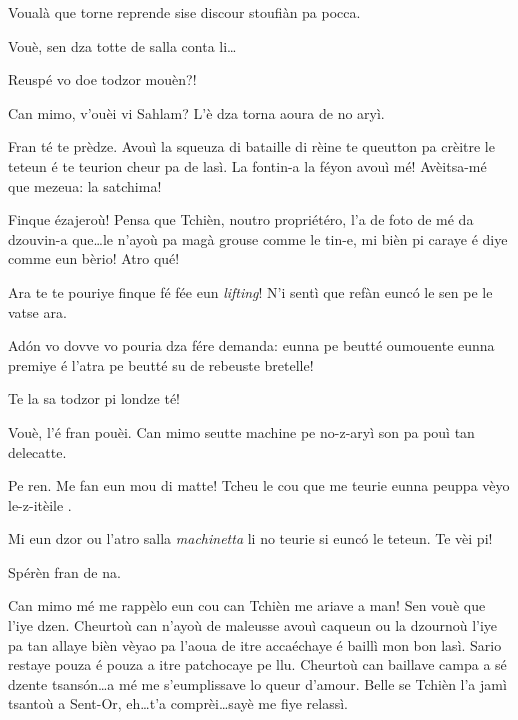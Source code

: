 \begin{drama}
\Cobraspeaks Voualà que torne reprende sise discour stoufiàn pa pocca.

\Piccinaspeaks Vouè, sen dza totte de salla conta li\ldots

\Tzardounspeaks Reuspé vo doe todzor mouèn?!

\Cobraspeaks Can mimo, v'ouèi vi Sahlam? L’è dza torna aoura de no aryì.

\Piccinaspeaks Fran té te prèdze. Avouì la squeuza di bataille di rèine te queutton pa crèitre le teteun é te teurion cheur pa de lasì\latte. La fontin-a la féyon avouì mé!  Avèitsa-mé que mezeua: la satchima!

\Tzardounspeaks Finque ézajeroù! Pensa que Tchièn, noutro propriétéro, l’a de foto de mé da dzouvin-a que\ldots le n’ayoù pa magà grouse comme le tin-e, mi bièn pi caraye é diye comme eun bèrio! Atro qué!


\Piccinaspeaks  {} Ara te te pouriye finque fé fée eun \textit{lifting}! N’i sentì que refàn eunc\'o le sen pe le vatse ara.
 

\Tzardounspeaks Ad\'on vo dovve vo pouria dza fére demanda: eunna  pe beutté oumouente eunna premiye é l’atra pe beutté su de rebeuste bretelle!

\Piccinaspeaks Te la sa todzor pi londze té! 

\Tzardounspeaks Vouè, l’é fran pouèi. Can mimo seutte machine pe no-z-aryì son pa pouì tan delecatte.

\Piccinaspeaks Pe ren. Me fan eun mou di matte! Tcheu le cou que me teurie eunna peuppa vèyo le-z-itèile \stella \dolore \stella \dolore \stella .

\Tzardounspeaks Mi eun dzor ou l’atro salla \textit{machinetta} li no teurie si eunc\'o le teteun. Te vèi pi!

\Piccinaspeaks Spérèn fran de na.

\Tzardounspeaks Can mimo mé me rappèlo eun cou can Tchièn me a\-ria\-ve a man! Sen vouè que l'iye dzen. Cheurtoù can n’ayoù de maleusse avouì caqueun ou la dzournoù l'iye pa tan allaye bièn vèyao pa l’aoua de itre accaéchaye é baillì mon bon lasì. Sario restaye pouza é pouza a itre patchocaye pe llu. Cheurtoù can baillave campa a sé dzente tsans\'on\ldots a mé me s’eumplissave lo queur d’amour. Belle se Tchièn l’a jamì tsantoù a Sent-Or,  eh\ldots t’a comprèi\ldots sayè me fiye relassì.


\end{drama}
